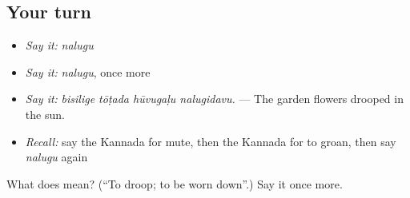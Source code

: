 \subsection*{Your turn}
\begin{itemize}
\raggedright
  \item \emph{Say it:} \emph{nalugu}
  \item \emph{Say it:} \emph{nalugu}, once more
  \item \emph{Say it:} \emph{bisilige tōṭada hūvugaḷu nalugidavu.} — The garden flowers drooped in the sun.
  \item \emph{Recall:} say the Kannada for mute, then the Kannada for to groan, then say \emph{nalugu} again
\end{itemize}

\begin{tcolorbox}[breakable,colback=teal!4,colframe=teal!35!black,title={Before you move on}]
What does  mean? (\textquotedblleft{}To droop; to be worn down\textquotedblright{}.) Say it once more.
\end{tcolorbox}
